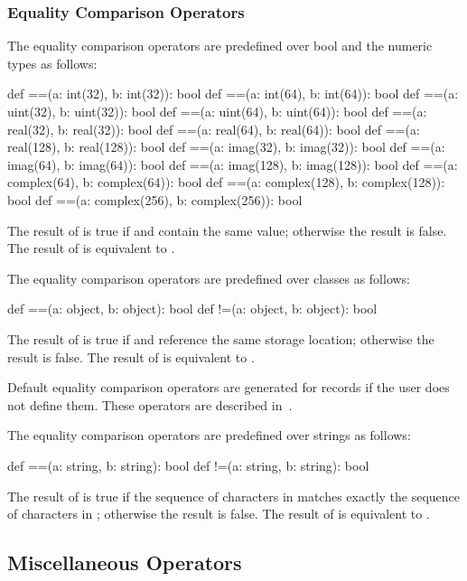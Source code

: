 \subsubsection{Equality Comparison Operators}
\label{Equality_Comparison_Operators}

The equality comparison operators are predefined over bool and the
numeric types as follows:
\begin{chapel}
def ==(a: int(32), b: int(32)): bool
def ==(a: int(64), b: int(64)): bool
def ==(a: uint(32), b: uint(32)): bool
def ==(a: uint(64), b: uint(64)): bool
def ==(a: real(32), b: real(32)): bool
def ==(a: real(64), b: real(64)): bool
def ==(a: real(128), b: real(128)): bool
def ==(a: imag(32), b: imag(32)): bool
def ==(a: imag(64), b: imag(64)): bool
def ==(a: imag(128), b: imag(128)): bool
def ==(a: complex(64), b: complex(64)): bool
def ==(a: complex(128), b: complex(128)): bool
def ==(a: complex(256), b: complex(256)): bool
\end{chapel}
The result of  is true if  and  contain
the same value; otherwise the result is false.  The result of  is equivalent to .

The equality comparison operators are predefined over classes as
follows:
\begin{chapel}
def ==(a: object, b: object): bool
def !=(a: object, b: object): bool
\end{chapel}
The result of  is true if  and  reference
the same storage location; otherwise the result is false.  The result
of  is equivalent to .

Default equality comparison operators are generated for records if the
user does not define them.  These operators are described
in~.

The equality comparison operators are predefined over strings as
follows:
\begin{chapel}
def ==(a: string, b: string): bool
def !=(a: string, b: string): bool
\end{chapel}
The result of  is true if the sequence of characters
in  matches exactly the sequence of characters in ;
otherwise the result is false.  The result of  is
equivalent to .

\subsection{Miscellaneous Operators}
\label{Miscellaneous_Operators}

